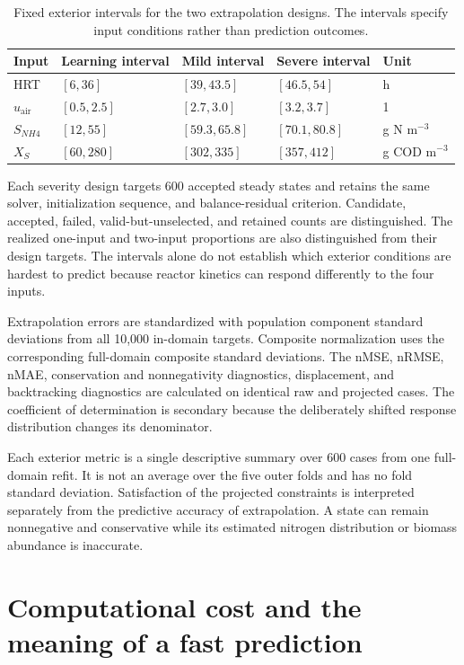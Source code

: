 \begin{table}[htbp]
\centering
\caption{Fixed exterior intervals for the two extrapolation designs. The intervals specify input conditions rather than prediction outcomes.}
\label{tab:reactor_extrapolation_domain}
\small
\begin{tabular}{lllll}
\toprule
Input & Learning interval & Mild interval & Severe interval & Unit\\
\midrule
HRT & $[6,36]$ & $[39,43.5]$ & $[46.5,54]$ & h\\
$u_{\mathrm{air}}$ & $[0.5,2.5]$ & $[2.7,3.0]$ & $[3.2,3.7]$ & 1\\
$S_{NH4}$ & $[12,55]$ & $[59.3,65.8]$ & $[70.1,80.8]$ & g N m$^{-3}$\\
$X_S$ & $[60,280]$ & $[302,335]$ & $[357,412]$ & g COD m$^{-3}$\\
\bottomrule
\end{tabular}
\end{table}

Each severity design targets 600 accepted steady states and retains the same solver, initialization sequence, and balance-residual criterion. Candidate, accepted, failed, valid-but-unselected, and retained counts are distinguished. The realized one-input and two-input proportions are also distinguished from their design targets. The intervals alone do not establish which exterior conditions are hardest to predict because reactor kinetics can respond differently to the four inputs.

Extrapolation errors are standardized with population component standard deviations from all 10,000 in-domain targets. Composite normalization uses the corresponding full-domain composite standard deviations. The nMSE, nRMSE, nMAE, conservation and nonnegativity diagnostics, displacement, and backtracking diagnostics are calculated on identical raw and projected cases. The coefficient of determination is secondary because the deliberately shifted response distribution changes its denominator.

Each exterior metric is a single descriptive summary over 600 cases from one full-domain refit. It is not an average over the five outer folds and has no fold standard deviation. Satisfaction of the projected constraints is interpreted separately from the predictive accuracy of extrapolation. A state can remain nonnegative and conservative while its estimated nitrogen distribution or biomass abundance is inaccurate.

\section{Computational cost and the meaning of a fast prediction}

